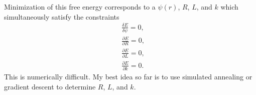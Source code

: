 \documentclass[12pt]{article}
\begin{document}
Minimization of this free energy corresponds to a $\psi(r)$, $R$, $L$, and $k$ which simultaneously satisfy the constraints
\begin{align}
&\frac{\delta E}{\delta \psi}=0\label{eq:dEdpsi0},\\
&\frac{\partial E}{\partial R}=0\label{eq:dEdR0},\\
&\frac{\partial E}{\partial L}=0\label{eq:dEdL0},\\
&\frac{\partial E}{\partial k}=0\label{eq:dEdk0}.
\end{align}
This is numerically difficult. My best idea so far is to use simulated annealing or gradient descent to determine $R$, $L$, and $k$.


\clearpage


\end{document}
